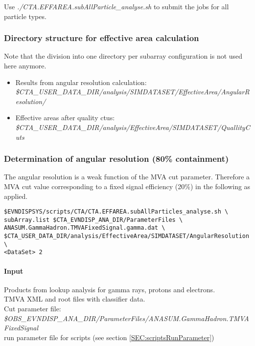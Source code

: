 \documentclass[titlepage,a4paper,twoside,11pt]{report}
\begin{document}
Use {\it  ./CTA.EFFAREA.subAllParticle\_analyse.sh} to submit the jobs for all particle types.

\subsubsection{Directory structure for effective area calculation}

Note that the division into one directory per subarray configuration is not used here anymore.

\begin{itemize}
\item Results from angular resolution calculation: \\
{\it \$CTA\_USER\_DATA\_DIR/analysis/SIMDATASET/EffectiveArea/AngularResolution/}
\item Effective areas after quality ctus:\\
{\it \$CTA\_USER\_DATA\_DIR/analysis/EffectiveArea/SIMDATASET/QuallityCuts}
\end{itemize}

\subsubsection{Determination of angular resolution (80\% containment)} 

The angular resolution is a weak function of the MVA cut parameter. 
Therefore a MVA cut value corresponding to a fixed signal efficiency (20\%) 
in the following as applied.

\begin{lstlisting}
$EVNDISPSYS/scripts/CTA/CTA.EFFAREA.subAllParticles_analyse.sh \
subArray.list $CTA_EVNDISP_ANA_DIR/ParameterFiles \
ANASUM.GammaHadron.TMVAFixedSignal.gamma.dat \
$CTA_USER_DATA_DIR/analysis/EffectiveArea/SIMDATASET/AngularResolution \
<DataSet> 2
\end{lstlisting}

\paragraph{Input}
Products from lookup analysis for gamma rays, protons and electrons. \\
TMVA XML and root files with classifier data. \\
Cut parameter file: \\
{\it \$OBS\_EVNDISP\_ANA\_DIR/ParameterFiles/ANASUM.GammaHadron.TMVAFixedSignal}\\
run parameter file for scripts (see section \ref{SEC:scriptsRunParameter})
\end{document}
